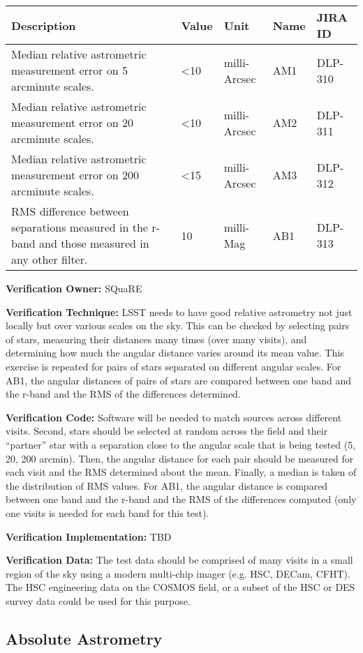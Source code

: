 \begin{longtable}[]{@{}lllll@{}}
\toprule
Description & Value & Unit & Name & JIRA ID\tabularnewline
\midrule
\endhead
Median relative astrometric measurement error on 5 arcminute scales. &
\textless{}10 & milli-Arcsec & AM1 & DLP-310\tabularnewline
Median relative astrometric measurement error on 20 arcminute scales. &
\textless{}10 & milli-Arcsec & AM2 & DLP-311\tabularnewline
Median relative astrometric measurement error on 200 arcminute scales. &
\textless{}15 & milli-Arcsec & AM3 & DLP-312\tabularnewline
RMS difference between separations measured in the r-band and those
measured in any other filter. & 10 & milli-Mag & AB1 &
DLP-313\tabularnewline
\bottomrule
\end{longtable}

\textbf{Verification Owner:} SQuaRE

\textbf{Verification Technique:} LSST needs to have good relative
astrometry not just locally but over various scales on the sky. This can
be checked by selecting pairs of stars, measuring their distances many
times (over many visits), and determining how much the angular distance
varies around its mean value. This exercise is repeated for pairs of
stars separated on different angular scales. For AB1, the angular
distances of pairs of stars are compared between one band and the r-band
and the RMS of the differences determined.

\textbf{Verification Code:} Software will be needed to match sources
across different visits. Second, stars should be selected at random
across the field and their ``partner'' star with a separation close to
the angular scale that is being tested (5, 20, 200 arcmin). Then, the
angular distance for each pair should be measured for each visit and the
RMS determined about the mean. Finally, a median is taken of the
distribution of RMS values. For AB1, the angular distance is compared
between one band and the r-band and the RMS of the differences computed
(only one visits is needed for each band for this test).

\textbf{Verification Implementation:} TBD

\textbf{Verification Data:} The test data should be comprised of many
visits in a small region of the sky using a modern multi-chip imager
(e.g. HSC, DECam, CFHT). The HSC engineering data on the COSMOS field,
or a subset of the HSC or DES survey data could be used for this
purpose.

\subsection{Absolute Astrometry}\label{absolute-astrometry}

